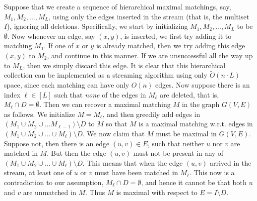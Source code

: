 \documentclass[11pt,a4paper]{article}
\begin{document}
Suppose that we create a sequence of hierarchical maximal matchings, say, $M_1, M_2, ..., M_{L}$, using only the edges inserted in the stream (that is, the multiset $I$), ignoring all deletions. Specifically, we start by initializing $M_1, M_2, ..., M_L$ to be $\emptyset$. Now whenever an edge, say $(x,y)$, is inserted, we first try adding it to matching $M_1$. If one of $x$ or $y$ is already matched, then we try adding this edge $(x,y)$ to $M_2$, and continue in this manner. If we are unsuccessful all the way up to $M_L$, then we simply discard this edge. It is clear that this hierarchical collection can be implemented as a streaming algorithm using only $\tilde{O}(n \cdot L)$ space, since each matching can have only $O(n)$ edges. Now suppose there is an index $\ell \in [L]$ such that {\em none} of the edges in $M_{\ell}$ are deleted, that is, $M_{\ell} \cap D = \emptyset$. Then we can recover a maximal matching $M$ in the graph $G(V,E)$ as follows. We initialize $M = M_{\ell}$, and then greedily add edges in $(M_1 \cup M_2 \cup ... M_{\ell-1}) \setminus D$ to $M$ so that $M$ is a maximal matching w.r.t. edges in $(M_1 \cup M_2 \cup \dots \cup M_{\ell}) \setminus D$. We now claim that $M$ must be maximal in $G(V,E)$. Suppose not, then there is an edge $(u,v) \in E$, such that neither $u$ nor $v$ are matched in $M$. But then the edge $(u,v)$ must not be present in any of $(M_1 \cup M_2 \cup \dots \cup M_{\ell}) \setminus D$. This means that when the edge $(u,v)$ arrived in the stream, at least one of $u$ or $v$ must have been matched in $M_{\ell}$. This now is a contradiction to
our assumption, $M_{\ell} \cap D = \emptyset$, and hence it cannot be that both $u$ and $v$ are unmatched in $M$.
Thus $M$ is maximal with respect to $E = I \setminus D$.
\end{document}
